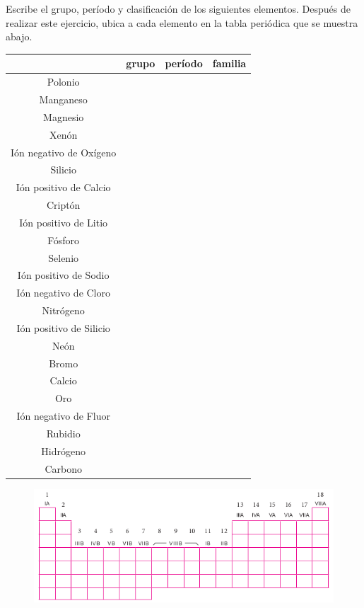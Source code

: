 \question Escribe el grupo, período y clasificación de los siguientes elementos. Después de realizar este ejercicio, ubica a cada elemento en la tabla
periódica que se muestra abajo.


\begin{tabular}{c|c|c|c}
    \hline
                            & grupo & período & familia \\ \hline
    Polonio                 &       &         &         \\    \hline
    Manganeso               &       &         &         \\    \hline
    Magnesio                &       &         &         \\    \hline
    Xenón                   &       &         &         \\    \hline
    Ión negativo de Oxígeno &       &         &         \\    \hline
    Silicio                 &       &         &         \\    \hline
    Ión positivo de Calcio  &       &         &         \\    \hline
    Criptón                 &       &         &         \\    \hline
    Ión positivo de Litio   &       &         &         \\    \hline
    Fósforo                 &       &         &         \\    \hline
    Selenio                 &       &         &         \\    \hline
    Ión positivo de Sodio   &       &         &         \\    \hline
    Ión negativo de Cloro   &       &         &         \\    \hline
    Nitrógeno               &       &         &         \\    \hline
    Ión positivo de Silicio &       &         &         \\    \hline
    Neón                    &       &         &         \\    \hline
    Bromo                   &       &         &         \\    \hline
    Calcio                  &       &         &         \\    \hline
    Oro                     &       &         &         \\    \hline
    Ión negativo de Fluor   &       &         &         \\    \hline
    Rubidio                 &       &         &         \\    \hline
    Hidrógeno               &       &         &         \\    \hline
    Carbono                 &       &         &         \\    \hline
\end{tabular}

\begin{figure}[H]
    \includegraphics[width=\linewidth]{../images/tablavacia.png}
\end{figure}